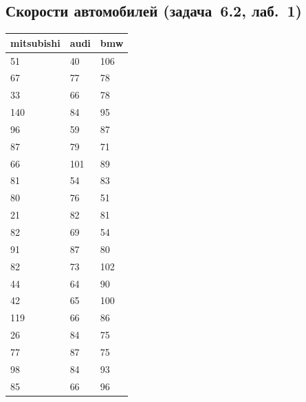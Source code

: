 \subsection{Скорости автомобилей (задача~6.2, лаб.~1)}
\label{app:data-gov}
\begin{center}
\footnotesize
\begin{tabular}{@{}lll@{}}
 \toprule
\textbf{mitsubishi} & \textbf{audi} & \textbf{bmw} \\
 \midrule
51 & 40 & 106 \\
67 & 77 & 78 \\
33 & 66 & 78 \\
140 & 84 & 95 \\
96 & 59 & 87 \\
87 & 79 & 71 \\
66 & 101 & 89 \\
81 & 54 & 83 \\
80 & 76 & 51 \\
21 & 82 & 81 \\
82 & 69 & 54 \\
91 & 87 & 80 \\
82 & 73 & 102 \\
44 & 64 & 90 \\
42 & 65 & 100 \\
119 & 66 & 86 \\
26 & 84 & 75 \\
77 & 87 & 75 \\
98 & 84 & 93 \\
85 & 66 & 96 \\
 \bottomrule
\end{tabular}
\end{center}

